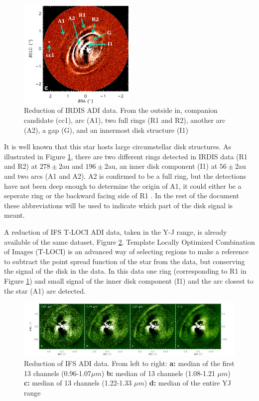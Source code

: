 \documentclass[twoside,single]{lion-msc}
\begin{document}
\begin{figure}
\includegraphics[width = 0.5\textwidth]{irdisjos}
\caption{Reduction of IRDIS ADI data. From the outside in, companion candidate (cc1), arc (A1), two full rings (R1 and R2), another arc (A2), a gap (G), and an innermost disk structure (I1)\citep{DeBoer2016}}
\label{fig:irdisjos}
\end{figure}

\noindent
It is well known that this star hosts large circumstellar disk structures.  As illustrated in Figure \ref{fig:irdisjos}, there are two different rings detected in IRDIS data (R1 and R2) at $278\pm 2$au and $196\pm 2$au, an inner disk component (I1) at $56\pm 2$au and two arcs (A1 and A2). A2 is confirmed to be a full ring, but the detections have not been deep enough to determine the origin of A1, it could either be a seperate ring or the backward facing side of R1 \citep{DeBoer2016}. In the rest of the document these abbreviations will be used to indicate which part of the disk signal is meant.
\bigskip

A reduction of IFS T-LOCI ADI data, taken in the Y-J range, is already available of the same dataset, Figure \ref{fig:ifsjos}. Template Locally Optimized Combination of Images (T-LOCI) is an advanced way of selecting regions to make a reference to subtract the point spread function of the star from the data, but conserving the signal of the disk in the data. In this data one ring (corresponding to R1 in Figure \ref{fig:irdisjos}) and small signal of the inner disk component (I1) and the arc closest to the star (A1) are detected.

\begin{figure}[ht]
\includegraphics[width = \textwidth]{ifsjos}
\caption{Reduction of IFS ADI data. From left to right: \textbf{a:} median of the first 13 channels (0.96-1.07$\mu m$) \textbf{b:} median of 13 channels (1.08-1.21 $\mu m$) \textbf{c:} median of 13 channels (1.22-1.33 $\mu m$) \textbf{d:} median of the entire YJ range \citep{DeBoer2016}}
\label{fig:ifsjos}
\end{figure}
\end{document}
